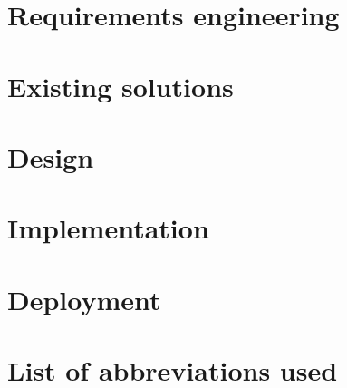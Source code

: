 \documentclass[thesis=B,english]{FITthesis}[2019/12/23]
\begin{document}
\chapter{Requirements engineering}


\chapter{Existing solutions}


\chapter{Design}



\chapter{Implementation}


\chapter{Deployment}


\begin{conclusion}
	
\end{conclusion}




\appendix

\chapter{List of abbreviations used}
\begin{description}
	
\end{description}
\end{document}
